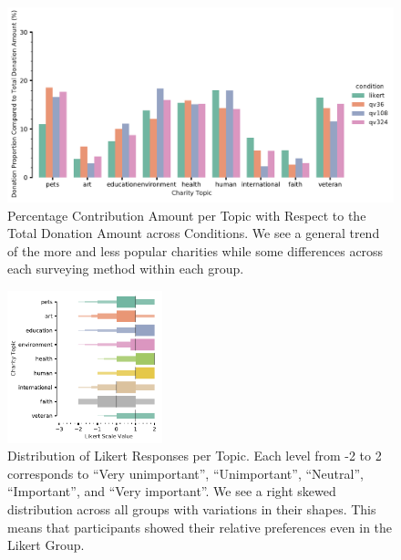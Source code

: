 \begin{figure}[htpb]
    \centering
    \includegraphics[width=\textwidth, keepaspectratio=true]{content/image/normalized_contributions_per_topic_across_conditions.pdf}
    \caption{
      Percentage Contribution Amount per Topic with Respect to the Total Donation Amount across Conditions.
      We see a general trend of the more and less popular charities while some differences across each
      surveying method within each group.
    }
    \label{fig:topic_don_exp1}
\end{figure}

\begin{figure}[htpb]
    \centering
    \includegraphics[width=0.4\textwidth, keepaspectratio=true]{content/image/likert_distribution_per_topic.pdf}
    \caption{
      Distribution of Likert Responses per Topic. 
      Each level from -2 to 2 corresponds to 
      ``Very unimportant'', ``Unimportant'', ``Neutral'', ``Important'', and ``Very important''.
      We see a right skewed distribution across all groups with variations in their shapes.
      This means that participants showed their relative preferences even in the Likert Group.
    }
    \label{fig:likert_exp1}
\end{figure}

